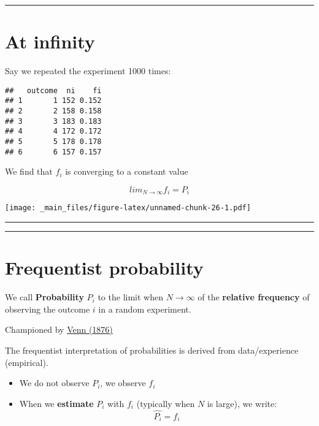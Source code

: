 \documentclass[
]{book}
\providecommand{\tightlist}{%
  \setlength{\itemsep}{0pt}\setlength{\parskip}{0pt}}
\begin{document}
\begin{center}\rule{0.5\linewidth}{0.5pt}\end{center}

\hypertarget{at-infinity}{%
\section{At infinity}\label{at-infinity}}

Say we repeated the experiment 1000 times:

\begin{verbatim}
##   outcome  ni    fi
## 1       1 152 0.152
## 2       2 158 0.158
## 3       3 183 0.183
## 4       4 172 0.172
## 5       5 178 0.178
## 6       6 157 0.157
\end{verbatim}

We find that \(f_i\) is converging to a constant value

\[lim_{N\rightarrow \infty} f_i = P_i\]

\texttt{[image: \_main\_files/figure-latex/unnamed-chunk-26-1.pdf]}

\begin{center}\rule{0.5\linewidth}{0.5pt}\end{center}

\begin{center}\rule{0.5\linewidth}{0.5pt}\end{center}

\hypertarget{frequentist-probability}{%
\section{Frequentist probability}\label{frequentist-probability}}

We call \textbf{Probability} \(P_i\) to the limit when \(N \rightarrow \infty\) of the \textbf{relative frequency} of observing the outcome \(i\) in a random experiment.

Championed by \href{https://plato.stanford.edu/entries/probability-interpret/\#ClaPro}{Venn (1876)}

The frequentist interpretation of probabilities is derived from data/experience (empirical).

\begin{itemize}
\tightlist
\item
  We do not observe \(P_i\), we observe \(f_i\)
\item
  When we \textbf{estimate} \(P_i\) with \(f_i\) (typically when \(N\) is large), we write: \[\hat{P_i}=f_i\]
\end{itemize}
\end{document}
